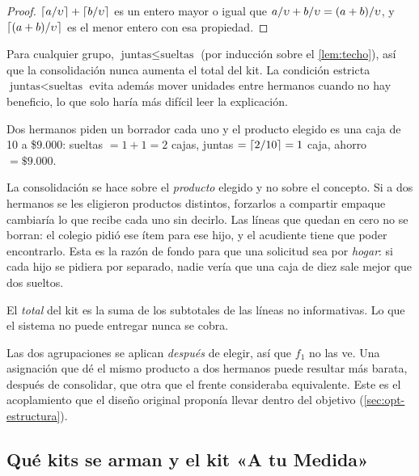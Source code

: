 \begin{proof}
$\left\lceil a/\upsilon \right\rceil+\left\lceil b/\upsilon \right\rceil$ es un entero mayor o igual que
$a/\upsilon+b/\upsilon=(a+b)/\upsilon$, y $\left\lceil (a+b)/\upsilon \right\rceil$ es el menor entero con esa
propiedad.
\end{proof}

\begin{corolario}
\label{cor:consolidar}
Para cualquier grupo, $\text{juntas}\leq\text{sueltas}$ (por inducción sobre
el \cref{lem:techo}), así que la consolidación nunca aumenta el total del kit.
La condición estricta $\text{juntas}<\text{sueltas}$ evita además mover
unidades entre hermanos cuando no hay beneficio, lo que solo haría más difícil
leer la explicación.
\end{corolario}

\begin{ejemplo}
Dos hermanos piden un borrador cada uno y el producto elegido es una caja de
10 a \$9.000: sueltas $=1+1=2$ cajas, juntas $=\left\lceil 2/10 \right\rceil=1$ caja, ahorro
$=\$9.000$.
\end{ejemplo}

La consolidación se hace sobre el \emph{producto} elegido y no sobre el
concepto. Si a dos hermanos se les eligieron productos distintos, forzarlos a
compartir empaque cambiaría lo que recibe cada uno sin decirlo. Las líneas que
quedan en cero no se borran: el colegio pidió ese ítem para ese hijo, y el
acudiente tiene que poder encontrarlo. Esta es la razón de fondo para que una
solicitud sea por \emph{hogar}: si cada hijo se pidiera por separado, nadie
vería que una caja de diez sale mejor que dos sueltos.

El \emph{total} del kit es la suma de los subtotales de las líneas no
informativas. Lo que el sistema no puede entregar nunca se cobra.

\begin{observacion}
Las dos agrupaciones se aplican \emph{después} de elegir, así que $f_1$ no las
ve. Una asignación que dé el mismo producto a dos hermanos puede resultar más
barata, después de consolidar, que otra que el frente consideraba
equivalente. Este es el acoplamiento que el diseño original proponía llevar
dentro del objetivo (\cref{sec:opt-estructura}).
\end{observacion}

\subsection{Qué kits se arman y el kit «A tu Medida»}
\label{sec:opt-medida}

